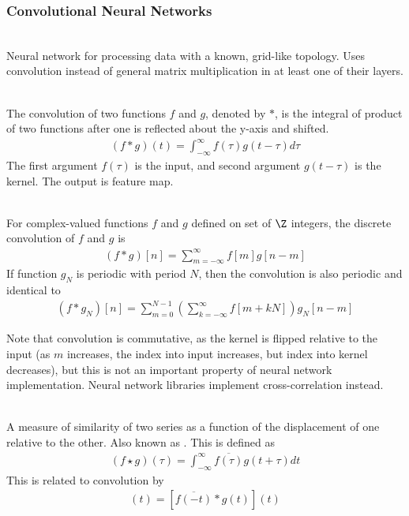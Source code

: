 \subsubsection{Convolutional Neural Networks}

\begin{definition} \\
Neural network for processing data with a known, grid-like topology. Uses convolution instead of general matrix multiplication in at least one of their layers.
\end{definition}

\begin{definition} \\
The convolution of two functions $f$ and $g$, denoted by $\ast$, is the integral of product of two functions after one is reflected about the y-axis and shifted.
\begin{align*}
(f \ast g)(t) = \int_{-\infty}^{\infty} f(\tau)g(t - \tau) d \tau \nonumber
\end{align*} 
The first argument $f(\tau)$ is the input, and second argument $g(t - \tau)$ is the kernel. The output is feature map.
\end{definition}

\begin{definition} \\
For complex-valued functions $f$ and $g$ defined on set of $\Z$ integers, the discrete convolution of $f$ and $g$ is
\begin{align*}
(f \ast g)[n] = \sum\limits_{m=-\infty}^{\infty} f[m] g[n-m] \nonumber
\end{align*}
If function $g_N$ is periodic with period $N$, then the convolution is also periodic and identical to
\begin{align*}
(f \ast g_N)[n] = \sum\limits_{m=0}^{N-1} \left( \sum\limits_{k=-\infty}^{\infty} f[m+kN] \right) g_N [n-m] \nonumber
\end{align*}
\end{definition}

Note that convolution is commutative, as the kernel is flipped relative to the input (as $m$ increases, the index into input increases, but index into kernel decreases), but this is not an important property of neural network implementation. Neural network libraries implement cross-correlation instead.

\begin{definition} \\
A measure of similarity of two series as a function of the displacement of one relative to the other. Also known as . This is defined as
\begin{align*}
(f \star g)(\tau) = \int_{-\infty}^{\infty} \overline{f(\tau)}g(t + \tau) dt \nonumber
\end{align*}
This is related to convolution by
\begin{align*}
[f(t) \star g{t}](t) = [\overline{f(-t)} \ast g(t)] (t) \nonumber
\end{align*}
\end{definition}

